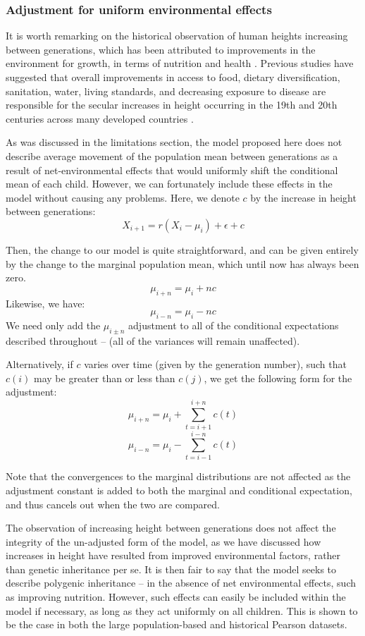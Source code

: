 \documentclass[a4paper,11pt]{article} %
\begin{document}
\subsubsection*{Adjustment for uniform environmental effects}
It is worth remarking on the historical observation of human heights increasing between generations, which has been attributed to improvements in the environment for growth, in terms of nutrition and health \cite{bogin}. Previous studies have suggested that overall improvements in access to food, dietary diversification, sanitation, water, living standards, and decreasing exposure to disease are responsible for the secular increases in height occurring in the 19th and 20th centuries across many developed countries \cite{perkins}. 

As was discussed in the limitations section, the model proposed here does not describe average movement of the population mean between generations as a result of net-environmental effects that would uniformly shift the conditional mean of each child. However, we can fortunately include these effects in the model without causing any problems. Here, we denote $c$ by the increase in height between generations:
$$X_{i+1} = r(X_i - \mu_i) + \epsilon + c$$

Then, the change to our model is quite straightforward, and can be given entirely by the change to the marginal population mean, which until now has always been zero.
$$\mu_{i+n} = \mu_i + nc$$
Likewise, we have:
$$\mu_{i-n} = \mu_i - nc$$
We need only add the $\mu_{i \pm n}$ adjustment to all of the conditional expectations described throughout -- (all of the variances will remain unaffected). 

Alternatively, if $c$ varies over time (given by the generation number), such that $c(i)$ may be greater than or less than $c(j)$, we get the following form for the adjustment:
$$\mu_{i+n} = \mu_i + \sum_{t = i+1}^{i+n} c(t)$$
$$\mu_{i-n} = \mu_i - \sum_{t = i-1}^{i-n} c(t)$$

Note that the convergences to the marginal distributions are not affected as the adjustment constant is added to both the marginal and conditional expectation, and thus cancels out when the two are compared. 

The observation of increasing height between generations does not affect the integrity of the un-adjusted form of the model, as we have discussed how increases in height have resulted from improved environmental factors, rather than genetic inheritance per se. It is then fair to say that the model seeks to describe polygenic inheritance -- in the absence of net environmental effects, such as improving nutrition. However, such effects can easily be included within the model if necessary, as long as they act uniformly on all children. This is shown to be the case in both the large population-based and historical Pearson datasets. 
\end{document}
